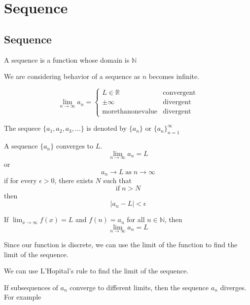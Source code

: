\chapter{Sequence}

\section{Sequence}

\begin{definition}[Sequence]
  A sequence is a function whose domain is \(\mathbb{N}\)
\end{definition}

We are considering behavior of a sequence as \(n\) becomes infinite.

\[
  \lim_{n \to \infty} a_n = \begin{cases}
    L \in \mathbb{R} & \text{convergent} \\
    \pm \infty & \text{divergent} \\
    \mathrm{more than one value} & \text{divergent}
  \end{cases}
\]

\begin{definition}
  The sequece \(\{a_1, a_2, a_3, \dots\}\) is denoted by \(\{a_n\}\) or \(\{a_n\}_{n=1}^{\infty}\)
\end{definition}

\begin{theorem}
  A sequence \(\{a_n\}\) converges to \(L\).
  \[
    \lim_{n \to \infty} a_n = L
  \]
  or
  \[
    a_n \to L \; \mathrm{as} \; n \to \infty
  \]
  if for every \(\epsilon > 0\), there exists \(N\) such that
  \[
    \mathrm{if} \; n > N 
  \]
  then
  \[
    |a_n - L| < \epsilon
  \]
\end{theorem}

\begin{theorem}[]
  If \(\lim_{x \to \infty} f(x) = L\) and \(f(n) = a_n\) for all \(n \in \mathbb{N}\), then
  \[
    \lim_{n \to \infty} a_n = L
  \]
\end{theorem}

Since our function is discrete, we can use the limit of the function to find the limit of the sequence.

\begin{remark}
  We can use L'Hopital's rule to find the limit of the sequence.
\end{remark}

If subsequences of $a_{n}$ converge to different limits, then the sequence $a_{n}$ diverges. For example

